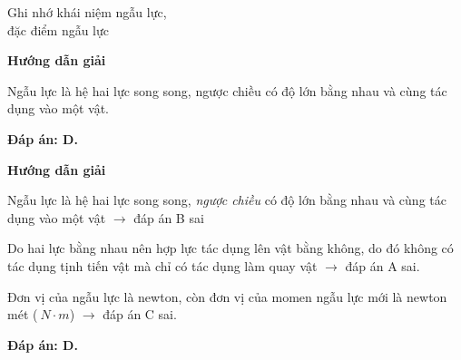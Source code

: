 \begin{dang}{Ghi nhớ khái niệm ngẫu lực,\\ đặc điểm ngẫu lực}
	{	\begin{center}
			\textbf{Hướng dẫn giải}
		\end{center}
		
		Ngẫu lực là hệ hai lực song song, ngược chiều có độ lớn bằng nhau và cùng tác dụng vào một vật.
		
		\textbf{Đáp án: D.}
	}
	{	\begin{center}
			\textbf{Hướng dẫn giải}
		\end{center}
		
		Ngẫu lực là hệ hai lực song song, \textit{ngược chiều} có độ lớn bằng nhau và cùng tác dụng vào một vật $\rightarrow$ đáp án B sai 
		
		Do hai lực bằng nhau nên hợp lực tác dụng lên vật bằng không, do đó không có tác dụng tịnh tiến vật mà chỉ có tác dụng làm quay vật $\rightarrow$ đáp án A sai. 
		
		Đơn vị của ngẫu lực là newton, còn đơn vị của momen ngẫu lực mới là newton mét ($\SI{}{N\cdot m}$) $\rightarrow$ đáp án C sai.
		
		\textbf{Đáp án: D.}
	}
\end{dang}
